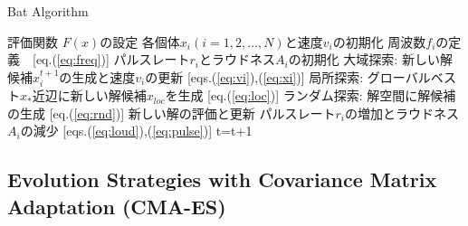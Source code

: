 \documentclass[a4j,11pt]{jarticle}
\begin{document}
\begin{algorithm}[H]
\caption{Bat Algorithm}
\label{code:ba}
\begin{algorithmic}[1]
\REQUIRE 評価関数 $F(x)$の設定
\STATE 各個体$x_i(i=1,2,...,N)$と速度$v_i$の初期化
\STATE 周波数$f_i$の定義　[eq.(\ref{eq:freq})]
\STATE パルスレート$r_i$とラウドネス$A_i$の初期化
\STATE 大域探索: 新しい解候補$x_i^{t+1}$の生成と速度$v_i$の更新 [eqs.(\ref{eq:vi}),(\ref{eq:xi})]
{}
\STATE 局所探索: グローバルベスト$x_*$近辺に新しい解候補$x_{loc}$を生成 [eq.(\ref{eq:loc})]
\ENDIF
\STATE ランダム探索: 解空間に解候補の生成 [eq.(\ref{eq:rnd})]
\STATE 新しい解の評価と更新
\STATE パルスレート$r_i$の増加とラウドネス$A_i$の減少 [eqs.(\ref{eq:loud}),(\ref{eq:pulse})]
\ENDIF
\ENDFOR
\STATE t=t+1
\ENDWHILE
\end{algorithmic}
\end{algorithm}

\subsection{Evolution Strategies with Covariance Matrix Adaptation (CMA-ES)}
\label{ss:cma-es}
  \makeatletter
  \renewcommand{\theequation}{\arabic{section}-\arabic{subsection}-\arabic{equation}}
  \makeatother
\end{document}
